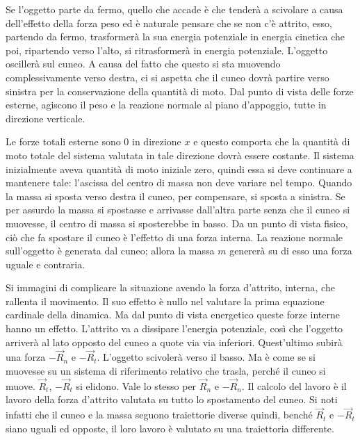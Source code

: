 \begin{figure}[htpb]
\end{figure}
\FloatBarrier
Se l'oggetto parte da fermo, quello che accade è che tenderà a scivolare a causa dell'effetto della forza peso ed è naturale pensare che se non c'è attrito, esso, partendo da fermo, trasformerà la sua energia potenziale in energia cinetica che poi, ripartendo verso l'alto, si ritrasformerà in energia potenziale. L'oggetto oscillerà sul cuneo. A causa del fatto che questo si sta muovendo complessivamente verso destra, ci si aspetta che il cuneo dovrà partire verso sinistra per la conservazione della quantità di moto. Dal punto di vista delle forze esterne, agiscono il peso e la reazione normale al piano d'appoggio, tutte in direzione verticale.

Le forze totali esterne sono $0$ in direzione $x$ e questo comporta che la quantità di moto totale del sistema valutata in tale direzione dovrà essere costante. Il sistema inizialmente aveva quantità di moto iniziale zero, quindi essa si deve continuare a mantenere tale: l'ascissa del centro di massa non deve variare nel tempo. Quando la massa si sposta verso destra il cuneo, per compensare, si sposta a sinistra. Se per assurdo la massa si spostasse e arrivasse dall'altra parte senza che il cuneo si muovesse, il centro di massa si sposterebbe in basso. Da un punto di vista fisico, ciò che fa spostare il cuneo è l'effetto di una forza interna. La reazione normale sull'oggetto è generata dal cuneo; allora la massa $m$ genererà su di esso una forza uguale e contraria.

Si immagini di complicare la situazione avendo la forza d'attrito, interna, che rallenta il movimento. Il suo effetto è nullo nel valutare la prima equazione cardinale della dinamica. Ma dal punto di vista energetico queste forze interne hanno un effetto. L'attrito va a dissipare l'energia potenziale, così che l'oggetto arriverà al lato opposto del cuneo a quote via via inferiori. Quest'ultimo subirà una forza $-\vec{R}_n$ e $-\vec{R}_t$. L'oggetto scivolerà verso il basso. Ma è come se si muovesse su un sistema di riferimento relativo che trasla, perché il cuneo si muove. $\vec{R}_t$, $-\vec{R}_t$ si elidono. Vale lo stesso per $\vec{R}_n$ e $-\vec{R}_n$. Il calcolo del lavoro è il lavoro della forza d'attrito valutata su tutto lo spostamento del cuneo. Si noti infatti che il cuneo e la massa seguono traiettorie diverse quindi, benché $\vec{R}_t$ e $-\vec{R}_t$ siano uguali ed opposte, il loro lavoro è valutato su una traiettoria differente.

